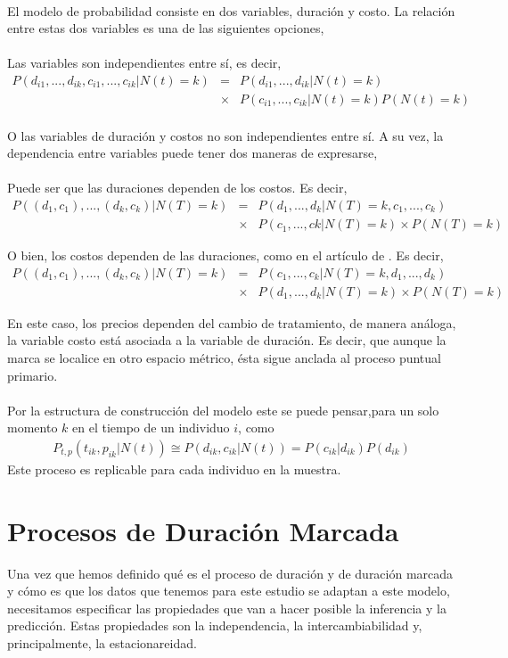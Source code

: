 \\
El modelo de probabilidad consiste en dos variables, duraci\'on y costo. La relaci\'on entre estas dos variables es una de las siguientes opciones,\\
\\
Las variables son independientes entre s\'i, es decir,
\begin{eqnarray*}
P(d_{i1},...,d_{ik},c_{i1},...,c_{ik}|N(t)=k)&=&P(d_{i1},...,d_{ik}|N(t)=k)\\
&\times& P(c_{i1},...,c_{ik}|N(t)=k)P(N(t)=k)
\end{eqnarray*}
\\
O las variables de duraci\'on y costos no son independientes entre s\'i. A su vez, la dependencia entre variables puede tener dos maneras de expresarse,\\
\\
Puede ser que las duraciones dependen de los costos. Es decir,
\begin{eqnarray*}
	P((d_1,c_1),...,(d_k,c_k)|N(T)=k)&=& P(d_1,...,d_k|N(T)=k,c_1,...,c_k)\\
								 &\times& P(c_1,...,ck|N(T)=k)\times P(N(T)=k)
\end{eqnarray*}

O bien, los costos dependen de las duraciones, como en el art\'iculo de \cite{engle1998autoregressive}. Es decir,
	\begin{eqnarray*}
     P((d_1,c_1),...,(d_k,c_k)|N(T)=k)&=& P(c_1,...,c_k|N(T)=k,d_1,...,d_k)\\
								 &\times& P(d_1,...,d_k|N(T)=k)\times P(N(T)=k)
    \end{eqnarray*}	

En este caso, los precios dependen del cambio de tratamiento, de manera an\'aloga, la variable costo est\'a asociada a la variable de duraci\'on. Es decir, que aunque la marca se localice en otro espacio m\'etrico, \'esta sigue anclada al proceso puntual primario.\\
\\
Por la estructura de construcci\'on del modelo este se puede pensar,para un solo momento $k$ en el tiempo de un individuo $i$, como
\begin{align}
P_{t,p}(t_{ik},p_{ik}|N(t))\cong P(d_{ik},c_{ik}|N(t)) = P(c_{ik}|d_{ik})P(d_{ik})
\end{align}
Este proceso es replicable para cada individuo en la muestra.
\section{Procesos de Duraci\'on Marcada}
Una vez que hemos definido qu\'e es el proceso de duraci\'on y de duraci\'on marcada y c\'omo es que los datos que tenemos para este estudio se adaptan a este modelo, necesitamos especificar las propiedades que van a hacer posible la inferencia y la predicci\'on. Estas propiedades son la independencia, la intercambiabilidad y, principalmente, la estacionareidad.
